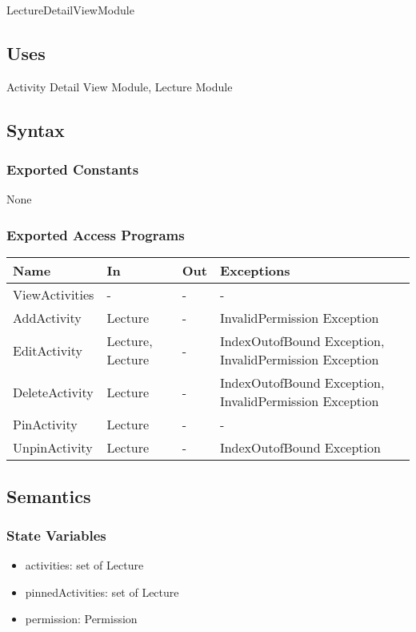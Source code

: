 \documentclass[12pt, titlepage]{article}
\begin{document}
LectureDetailViewModule

\subsection{Uses}

Activity Detail View Module, Lecture Module

\subsection{Syntax}

\subsubsection{Exported Constants}

None

\subsubsection{Exported Access Programs}
\begin{center}
\begin{tabular}{p{4cm} p{2cm} p{4cm} p{4cm}}
\hline
\textbf{Name} & \textbf{In} & \textbf{Out} & \textbf{Exceptions} \\
\hline
ViewActivities & - & - & - \\
AddActivity & Lecture & - & InvalidPermission Exception \\
EditActivity & Lecture, Lecture & - & IndexOutofBound Exception, InvalidPermission Exception \\
DeleteActivity & Lecture & - & IndexOutofBound Exception, InvalidPermission Exception \\
PinActivity & Lecture & - & - \\
UnpinActivity & Lecture & - & IndexOutofBound Exception \\
\hline
\end{tabular}
\end{center}

\subsection{Semantics}

\subsubsection{State Variables}

\begin{itemize}
  \item activities: set of Lecture
  \item pinnedActivities: set of Lecture
  \item permission: Permission
\end{itemize}
\end{document}
